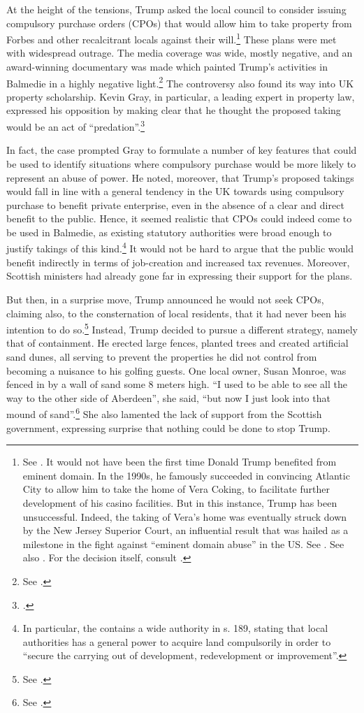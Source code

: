 At the height of the tensions, Trump asked the local council to consider issuing compulsory purchase orders (CPOs) that would allow him to take property from Forbes and other recalcitrant locals against their will.\footnote{See \cite{macaskill09}. It would not have been the first time Donald Trump benefited from eminent domain. In the 1990s, he famously succeeded in convincing Atlantic City to allow him to take the home of Vera Coking, to facilitate further development of his casino facilities. But in this instance, Trump has been unsuccessful. Indeed, the taking of Vera's home was eventually struck down by the New Jersey Superior Court, an influential result that was hailed as a milestone in the fight against ``eminent domain abuse'' in the US. See \cite[297-301]{jones00}. See also \cite{gillespie08}. For the decision itself, consult \cite{banin98}.} These plans were met with widespread outrage. The media coverage was wide, mostly negative, and an award-winning documentary was made which painted Trump's activities in Balmedie in a highly negative light.\footnote{See \cite{baxter11}.} The controversy also found its way into UK property scholarship. Kevin Gray, in particular, a leading expert in property law, expressed his opposition by making clear that he thought the proposed taking would be an act of ``predation''.\footcite{gray11}

In fact, the case prompted Gray to formulate a number of key features that could be used to identify situations where compulsory purchase would be more likely to represent an abuse of power. He noted, moreover, that Trump's proposed takings would fall in line with a general tendency in the UK towards using compulsory purchase to benefit private enterprise, even in the absence of a clear and direct benefit to the public. Hence, it seemed realistic that CPOs could indeed come to be used in Balmedie, as existing statutory authorities were broad enough to justify takings of this kind.\footnote{In particular, the \cite{tcpsa97} contains a wide authority in s. 189, stating that local authorities has a general power to acquire land compulsorily in order to ``secure the carrying out of development, redevelopment or improvement''.} It would not be hard to argue that the public would benefit indirectly in terms of job-creation and increased tax revenues. Moreover, Scottish ministers had already gone far in expressing their support for the plans.

But then, in a surprise move, Trump announced he would not seek CPOs, claiming also, to the consternation of local residents, that it had never been his intention to do so.\footnote{See \cite{scotsman11}.} Instead, Trump decided to pursue a different strategy, namely that of containment. He erected large fences, planted trees and created artificial sand dunes, all serving to prevent the properties he did not control from becoming a nuisance to his golfing guests. One local owner, Susan Monroe, was fenced in by a wall of sand some 8 meters high. ``I used to be able to see all the way to the other side of Aberdeen'', she said, ``but now I just look into that mound of sand''.\footnote{See \cite{booth12}.} She also lamented the lack of support from the Scottish government, expressing surprise that nothing could be done to stop Trump.

